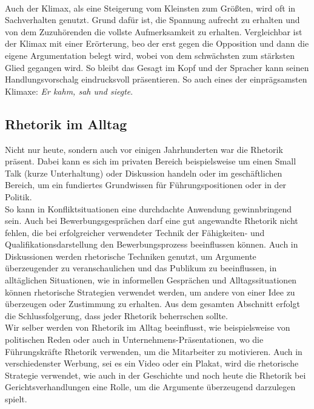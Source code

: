 \\Auch der Klimax, als eine Steigerung vom Kleinsten zum Größten, wird oft in Sachverhalten genutzt. Grund dafür ist, die Spannung aufrecht zu erhalten und von dem Zuzuhörenden die vollste Aufmerksamkeit zu erhalten. Vergleichbar ist der Klimax mit einer Erörterung, beo der erst gegen die Opposition und dann die eigene Argumentation belegt wird, wobei von dem schwächsten zum stärksten Glied gegangen wird. So bleibt das Gesagt im Kopf und der Spracher kann seinen Handlungsvorschalg eindrucksvoll präsentieren. So auch eines der einprägsamsten Klimaxe: \textit{Er kahm, sah und siegte}.

\subsection{Rhetorik im Alltag}
\label{sec: Rhetorik im Alltag}
Nicht nur heute, sondern auch vor einigen Jahrhunderten war die Rhetorik präsent. Dabei kann es sich im privaten Bereich beispielsweise um einen Small Talk (kurze Unterhaltung) oder Diskussion handeln oder im geschäftlichen Bereich, um ein fundiertes Grundwissen für Führungspositionen oder in der Politik.
\\So kann in Konfliktsituationen eine durchdachte Anwendung gewinnbringend sein. Auch bei Bewerbungsgesprächen darf eine gut angewandte Rhetorik nicht fehlen, die bei erfolgreicher verwendeter Technik der Fähigkeiten- und Qualifikationsdarstellung den Bewerbungsprozess beeinflussen können. Auch in Diskussionen werden rhetorische Techniken genutzt, um Argumente überzeugender zu veranschaulichen und das Publikum zu beeinflussen, in alltäglichen Situationen, wie in informellen Gesprächen und Alltagssituationen können rhetorische Strategien verwendet werden, um andere von einer Idee zu überzeugen oder Zustimmung zu erhalten. Aus dem gesamten Abschnitt erfolgt die Schlussfolgerung, dass jeder Rhetorik beherrschen sollte. 
\\Wir selber werden von Rhetorik im Alltag beeinflusst, wie beispielsweise von politischen Reden oder auch in Unternehmens-Präsentationen, wo die Führungskräfte Rhetorik verwenden, um die Mitarbeiter zu motivieren. Auch in verschiedenster Werbung, sei es ein Video oder ein Plakat, wird die rhetorische Strategie verwendet, wie auch in der Geschichte und noch heute die Rhetorik bei Gerichtsverhandlungen eine Rolle, um die Argumente überzeugend darzulegen spielt.

